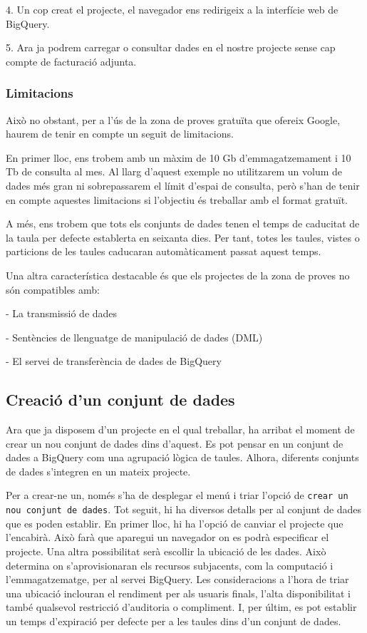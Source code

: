 \documentclass[11pt,longbibliography]{article}
\theoremstyle{definition}
\theoremstyle{remark}
\begin{document}
4. Un cop creat el projecte, el navegador ens redirigeix a la interfície web de BigQuery.



5. Ara ja podrem carregar o consultar dades en el nostre projecte sense cap compte de facturació adjunta.

\subsubsection{Limitacions}

Això no obstant, per a l’ús de la zona de proves gratuïta que ofereix Google, haurem de tenir en compte un seguit de limitacions.



En primer lloc, ens trobem amb un màxim de 10 Gb d’emmagatzemament i 10 Tb de consulta al mes. Al llarg d’aquest exemple no utilitzarem un volum de dades més gran ni sobrepassarem el límit d’espai de consulta, però s’han de tenir en compte aquestes limitacions si l’objectiu és treballar amb el format gratuït.



A més, ens trobem que tots els conjunts de dades tenen el temps de caducitat de la taula per defecte establerta en seixanta dies. Per tant, totes les taules, vistes o particions de les taules caducaran automàticament passat aquest temps.



Una altra característica destacable és que els projectes de la zona de proves no són compatibles amb:

- La transmissió de dades

- Sentències de llenguatge de manipulació de dades (DML)

- El servei de transferència de dades de BigQuery

\subsection{Creació d'un conjunt de dades}

Ara que ja disposem d'un projecte en el qual treballar, ha arribat el moment de crear un nou conjunt de dades dins d'aquest. Es pot pensar en un conjunt de dades a BigQuery com una agrupació lògica de taules. Alhora, diferents conjunts de dades s'integren en un mateix projecte. 



Per a crear-ne un, només s'ha de desplegar el menú i triar l'opció de \texttt{crear un nou conjunt de dades}. Tot seguit, hi ha diversos detalls per al conjunt de dades que es poden establir. En primer lloc, hi ha l'opció de canviar el projecte que l'encabirà. Això farà que aparegui un navegador on es podrà especificar el projecte. Una altra possibilitat serà escollir la ubicació de les dades. Això determina on s'aprovisionaran els recursos subjacents, com la computació i l'emmagatzematge, per al servei BigQuery. Les consideracions a l'hora de triar una ubicació inclouran el rendiment per als usuaris finals, l'alta disponibilitat i també qualsevol restricció d'auditoria o compliment. I, per últim, es pot establir un temps d'expiració per defecte per a les taules dins d'un conjunt de dades.
\end{document}
